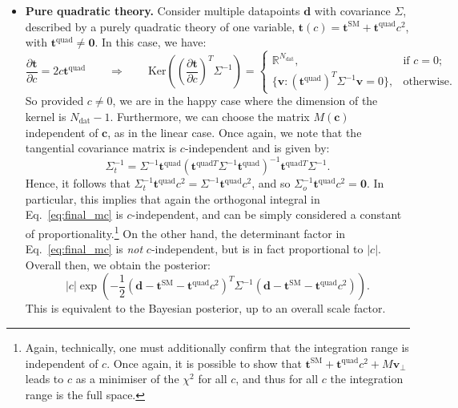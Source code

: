 \documentclass[withindex,glossary]{cam-thesis}
\renewcommand{\vec}[1]{\textbf{#1}} %
\begin{document}
\begin{itemize}
\item \textbf{Pure quadratic theory.} Consider multiple datapoints $\vec{d}$ with covariance $\Sigma$, described by a purely quadratic theory of one variable, $\vec{t}(c) = \vec{t}^{\text{SM}} + \vec{t}^{\text{quad}}c^2$, with $\vec{t}^{\text{quad}} \neq \vec{0}$. In this case, we have:
\begin{equation}
\frac{\partial \vec{t}}{\partial c} = 2c \vec{t}^{\text{quad}} \qquad \Rightarrow \qquad \textrm{Ker}\left( \left(\frac{\partial \vec{t}}{\partial c}\right)^T \Sigma^{-1} \right) = \begin{cases} \mathbb{R}^{N_{\text{dat}}}, & \text{if $c = 0$;} \\ \{ \vec{v} : (\vec{t}^{\text{quad}})^T \Sigma^{-1} \vec{v} = 0\}, & \text{otherwise.}\end{cases}
\end{equation}
So provided $c \neq 0$, we are in the happy case where the dimension of the kernel is $N_{\text{dat}} - 1$. Furthermore, we can choose the matrix $M(\vec{c})$ independent of $\vec{c}$, as in the linear case. Once again, we note that the tangential covariance matrix is $c$-independent and is given by:
\begin{equation}
\Sigma_t^{-1} = \Sigma^{-1} \vec{t}^{\text{quad}} ( \vec{t}^{\text{quad}T} \Sigma^{-1} \vec{t}^{\text{quad}} )^{-1} \vec{t}^{\text{quad}T} \Sigma^{-1}.
\end{equation}
Hence, it follows that $\Sigma^{-1}_t \vec{t}^{\text{quad}} c^2 = \Sigma^{-1} \vec{t}^{\text{quad}}c^2$, and so $\Sigma_o^{-1} \vec{t}^{\text{quad}} c^2 = \vec{0}$. In particular, this implies that again the orthogonal integral in Eq.~\eqref{eq:final_mc} is $c$-independent, and can be simply considered a constant of proportionality.\footnote{Again, technically, one must additionally confirm that the integration range is independent of $c$. Once again, it is possible to show that $\vec{t}^{\text{SM}} + \vec{t}^{\text{quad}}c^2 + M\vec{v}_{\perp}$ leads to $c$ as a minimiser of the $\chi^2$ for all $c$, and thus for all $c$ the integration range is the full space.} On the other hand, the determinant factor in Eq.~\eqref{eq:final_mc} is \textit{not} $c$-independent, but is in fact proportional to $|c|$. Overall then, we obtain the posterior:
\begin{equation}
|c| \exp\left( -\frac{1}{2} \left(\vec{d} - \vec{t}^{\text{SM}} - \vec{t}^{\text{quad}} c^2 \right)^T \Sigma^{-1} \left( \vec{d} - \vec{t}^{\text{SM}} - \vec{t}^{\text{quad}} c^2 \right) \right).
\end{equation}
This is equivalent to the Bayesian posterior, up to an overall scale factor.
\end{itemize}
\end{document}

